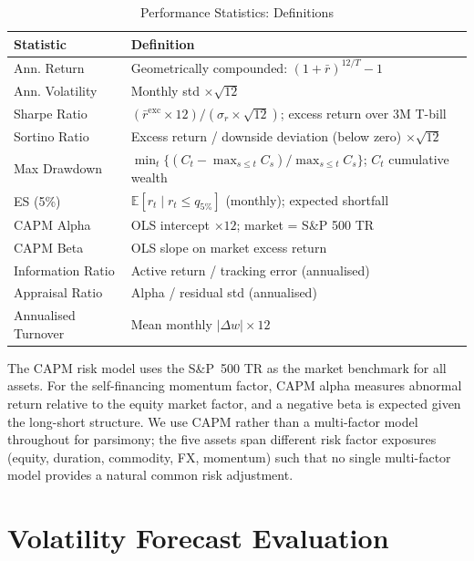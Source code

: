 \documentclass[12pt, a4paper]{article}
\newcommand{\E}{\mathbb{E}}
\begin{document}
\begin{table}[H]
  \centering
  \caption{Performance Statistics: Definitions}
  \label{tab:stats_def}
  \small
  \begin{tabularx}{\textwidth}{lX}
    \toprule
    \textbf{Statistic} & \textbf{Definition} \\
    \midrule
    Ann. Return       & Geometrically compounded: $(1+\bar{r})^{12/T}-1$ \\
    Ann. Volatility   & Monthly std $\times \sqrt{12}$ \\
    Sharpe Ratio      & $(\bar{r}^{\mathrm{exc}}\times 12) / (\sigma_r \times \sqrt{12})$;
                        excess return over 3M T-bill \\
    Sortino Ratio     & Excess return / downside deviation (below zero) $\times\sqrt{12}$ \\
    Max Drawdown      & $\min_t \{(C_t - \max_{s\leq t}C_s)/\max_{s\leq t}C_s\}$;
                        $C_t$ cumulative wealth \\
    ES (5\%)          & $\E[r_t \mid r_t \leq q_{5\%}]$ (monthly); expected shortfall \\
    CAPM Alpha        & OLS intercept $\times 12$; market = S\&P 500 TR \\
    CAPM Beta         & OLS slope on market excess return \\
    Information Ratio & Active return / tracking error (annualised) \\
    Appraisal Ratio   & Alpha / residual std (annualised) \\
    Annualised Turnover & Mean monthly $|\Delta w| \times 12$ \\
    \bottomrule
  \end{tabularx}
\end{table}

\noindent
The CAPM risk model uses the S\&P~500 TR as the market benchmark for all assets.
For the self-financing momentum factor, CAPM alpha measures abnormal return relative to
the equity market factor, and a negative beta is expected given the long-short structure.
We use CAPM rather than a multi-factor model throughout for parsimony; the five assets
span different risk factor exposures (equity, duration, commodity, FX, momentum) such
that no single multi-factor model provides a natural common risk adjustment.


\section{Volatility Forecast Evaluation}
\label{sec:forecast}
\end{document}
